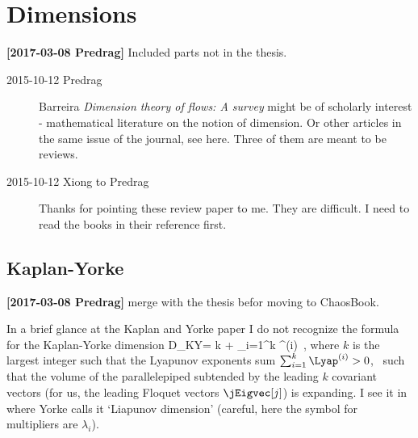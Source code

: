 
\section{Dimensions}

                                            \toCB
{\bf [2017-03-08 Predrag]} Included parts not in the thesis.

\begin{description}

    \item[2015-10-12 Predrag]
Barreira {\em Dimension theory of flows: {A} survey}
might be of scholarly interest - mathematical literature on the notion
of dimension. Or other articles in the same issue of the journal, see
{here}. Three of them are meant to be reviews.

\item[2015-10-12 Xiong to Predrag] Thanks for pointing these review paper
    to me. They are difficult. I need to read the books in their
    reference first.

    \end{description}



    \subsection{Kaplan-Yorke}
      \label{s-KapYorke}

                                            \toCB
{\bf [2017-03-08 Predrag]} merge with the thesis befor moving to ChaosBook.

In a brief glance at the Kaplan and Yorke
 {paper}
I do not recognize the formula for the Kaplan-Yorke dimension
\beq
    D_{KY}= k +  \sum_{i=1}^k \Lyap^{(i)}
\,,
where $k$ is the largest integer such that the Lyapunov exponents sum
$\sum_{i=1}^k \Lyap^{(i)}>0$, \ie\ such that the volume of the parallelepiped
subtended by the leading $k$ covariant vectors (for us, the leading
Floquet vectors $\jEigvec[j]$) is expanding.
I see it in  where Yorke calls it `Liapunov
dimension' (careful, here the symbol for multipliers are $\lambda_i$).

